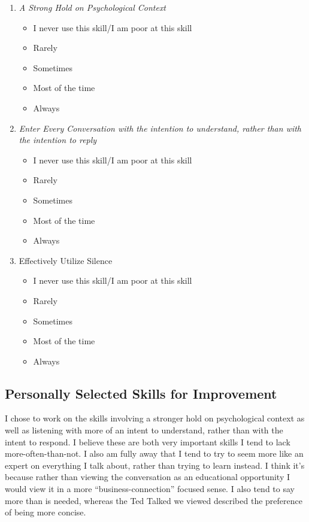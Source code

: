 \documentclass[stu,12pt]{apa7}
\begin{document}
      \begin{enumerate}
        \item \textit{A Strong Hold on Psychological Context}
          \begin{itemize}
            \item[\XSolidBrush] I never use this skill/I am poor at this skill
            \item[\XSolidBrush] Rarely
            \item[\XSolidBrush] Sometimes
            \item[\CheckmarkBold] Most of the time
            \item[\XSolidBrush] Always
          \end{itemize}
        \item \textit{%
          Enter Every Conversation with the intention to understand, rather %
            than with the intention to reply%
        }
          \begin{itemize}
            \item[\XSolidBrush] I never use this skill/I am poor at this skill
            \item[\CheckmarkBold] Rarely
            \item[\XSolidBrush] Sometimes
            \item[\XSolidBrush] Most of the time
            \item[\XSolidBrush] Always
          \end{itemize}
        \item Effectively Utilize Silence
          \begin{itemize}
            \item[\XSolidBrush] I never use this skill/I am poor at this skill
            \item[\XSolidBrush] Rarely
            \item[\CheckmarkBold] Sometimes
            \item[\XSolidBrush] Most of the time
            \item[\XSolidBrush] Always
          \end{itemize}
      \end{enumerate}

    \subsection{Personally Selected Skills for Improvement}
      I chose to work on the skills involving a stronger hold on psychological
        context as well as listening with more of an intent to understand,
        rather than with the intent to respond. I believe these are both very
        important skills I tend to lack more-often-than-not. I also am fully
        away that I tend to try to seem more like an expert on everything I talk
        about, rather than trying to learn instead. I think it's because rather
        than viewing the conversation as an educational opportunity I would
        view it in a more ``business-connection'' focused sense. I also tend to
        say more than is needed, whereas the Ted Talked we viewed described the
        preference of being more concise.
\end{document}
